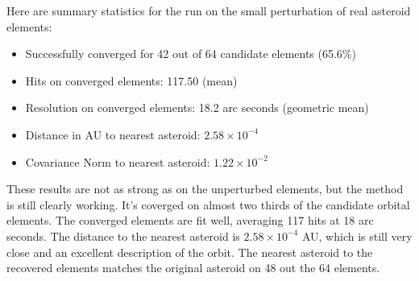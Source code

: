 Here are summary statistics for the run on the small perturbation of real asteroid elements:
\begin{itemize}
\item Successfully converged for 42 out of 64 candidate elements (65.6\%)
\item Hits on converged elements: 117.50 (mean)
\item Resolution on converged elements: 18.2 arc seconds (geometric mean)
\item Distance in AU to nearest asteroid: $2.58 \times 10^{-4}$
\item Covariance Norm to nearest asteroid: $1.22 \times 10^{-2}$
\end{itemize}
These results are not as strong as on the unperturbed elements, but the method is still clearly working.
It's coverged on almost two thirds of the candidate orbital elements.
The converged elements are fit well, averaging 117 hits at 18 arc seconds.
The distance to the nearest asteroid is $2.58 \times 10^{-4}$ AU, which is still very close and an excellent description of the orbit.
The nearest asteroid to the recovered elements matches the original asteroid on 48 out the 64 elements.

